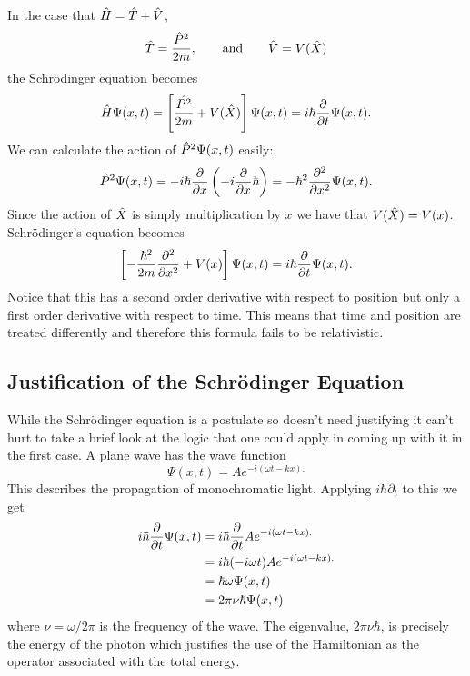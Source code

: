     In the case that \(\hat{H} = \hat{T} + \hat{V}\),
    \[\hat{T} = \frac{\hat{P}^2}{2m},\qquad\text{and}\qquad \hat{V} = V(\hat{X})\]
    the Schr\"odinger equation becomes
    \[\hat{H}\Psi(x, t) = \left[\frac{\hat{P^2}}{2m} + V(\hat{X})\right]\Psi(x, t) = i\hbar\pdv{t}\Psi(x, t).\]
    We can calculate the action of \(\hat{P}^2\Psi(x, t)\) easily:
    \[\hat{P}^2\Psi(x, t) = -i\hbar\pdv{x}\left(-i\pdv{x}\hbar\right) = -\hbar^2\pdv[2]{x}\Psi(x, t).\]
    Since the action of \(\hat{X}\) is simply multiplication by \(x\) we have that \(V(\hat{X}) = V(x)\).
    Schr\"odinger's equation becomes
    \[\left[-\frac{\hbar^2}{2m}\pdv[2]{x} + V(x)\right]\Psi(x, t) = i\hbar\pdv{t}\Psi(x, t).\]
    Notice that this has a second order derivative with respect to position but only a first order derivative with respect to time.
    This means that time and position are treated differently and therefore this formula fails to be relativistic.
    
    \subsection{Justification of the Schr\"odinger Equation}
    While the Schr\"odinger equation is a postulate so doesn't need justifying it can't hurt to take a brief look at the logic that one could apply in coming up with it in the first case.
    A plane wave has the wave function
    \[\Psi(x, t) = Ae^{-i(\omega t - kx).}\]
    This describes the propagation of monochromatic light.
    Applying \(i\hbar\partial_t\) to this we get
    \begin{align*}
        i\hbar\pdv{t}\Psi(x, t) &= i\hbar\pdv{t}Ae^{-i(\omega t - kx).}\\
        &= i\hbar(-i\omega t)Ae^{-i(\omega t - kx).}\\
        &= \hbar\omega\Psi(x, t)\\
        &= 2\pi\nu\hbar\Psi(x, t)
    \end{align*}
    where \(\nu = \omega/2\pi\) is the frequency of the wave.
    The eigenvalue, \(2\pi\nu\hbar\), is precisely the energy of the photon which justifies the use of the Hamiltonian as the operator associated with the total energy.
    
